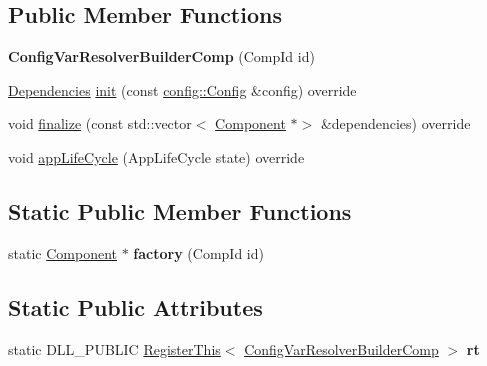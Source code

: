 \subsection*{Public Member Functions}
\begin{DoxyCompactItemize}
\item 
\mbox{\label{classtheoria_1_1core_1_1ConfigVarResolverBuilderComp_a14b04299b6eec3576e515ee204004df6}} 
{\bfseries Config\+Var\+Resolver\+Builder\+Comp} (Comp\+Id id)
\item 
\hyperlink{classtheoria_1_1core_1_1Dependencies}{Dependencies} \hyperlink{classtheoria_1_1core_1_1ConfigVarResolverBuilderComp_aadf94c8b3d765667eaf9d7c91ac65342}{init} (const \hyperlink{classtheoria_1_1config_1_1Config}{config\+::\+Config} \&config) override
\item 
void \hyperlink{classtheoria_1_1core_1_1ConfigVarResolverBuilderComp_ac1e585a908c7e0fa7db4bdf0a8b514bb}{finalize} (const std\+::vector$<$ \hyperlink{classtheoria_1_1core_1_1Component}{Component} $\ast$$>$ \&dependencies) override
\item 
void \hyperlink{classtheoria_1_1core_1_1ConfigVarResolverBuilderComp_ad7d3e9f8ab3a2837526ffc3eda4c6c38}{app\+Life\+Cycle} (App\+Life\+Cycle state) override
\end{DoxyCompactItemize}
\subsection*{Static Public Member Functions}
\begin{DoxyCompactItemize}
\item 
\mbox{\label{classtheoria_1_1core_1_1ConfigVarResolverBuilderComp_af290e5b8638b97e79d26a8d4597091ad}} 
static \hyperlink{classtheoria_1_1core_1_1Component}{Component} $\ast$ {\bfseries factory} (Comp\+Id id)
\end{DoxyCompactItemize}
\subsection*{Static Public Attributes}
\begin{DoxyCompactItemize}
\item 
\mbox{\label{classtheoria_1_1core_1_1ConfigVarResolverBuilderComp_ac80fd840a9280e471707d18c29557d9e}} 
static D\+L\+L\+\_\+\+P\+U\+B\+L\+IC \hyperlink{classtheoria_1_1core_1_1RegisterThis}{Register\+This}$<$ \hyperlink{classtheoria_1_1core_1_1ConfigVarResolverBuilderComp}{Config\+Var\+Resolver\+Builder\+Comp} $>$ {\bfseries rt}
\end{DoxyCompactItemize}
